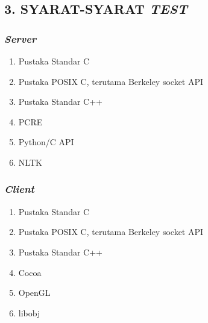 \subsection*{\textcolor{subsectioncolor}{\textsf{3. SYARAT-SYARAT \textit{TEST}}}}

\subsubsection*{\textit{Server}}
\begin{enumerate}
\item Pustaka Standar C
\item Pustaka POSIX C, terutama Berkeley socket API
\item Pustaka Standar C++
\item PCRE
\item Python/C API
\item NLTK
\end{enumerate}

\subsubsection*{\textit{Client}}
\begin{enumerate}
\item Pustaka Standar C
\item Pustaka POSIX C, terutama Berkeley socket API
\item Pustaka Standar C++
\item Cocoa
\item OpenGL
\item libobj
\end{enumerate}
